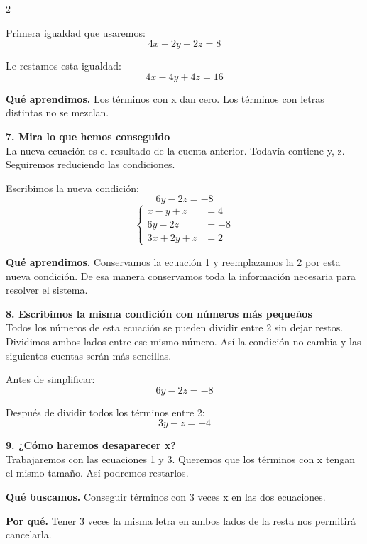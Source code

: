 \documentclass[11pt,a4paper,landscape]{article}
\begin{document}
\begin{multicols*}{2}
\begin{minipage}{\linewidth}
\par\smallskip Primera igualdad que usaremos:
\[4x + 2y + 2z = 8\]
\par\smallskip Le restamos esta igualdad:
\[4x - 4y + 4z = 16\]
\par\smallskip\textbf{Qué aprendimos.} Los términos con x dan cero. Los términos con letras distintas no se mezclan.
\end{minipage}\par\medskip
\noindent\begin{minipage}{\linewidth}\textbf{7. Mira lo que hemos conseguido}\\[2pt]La nueva ecuación es el resultado de la cuenta anterior. Todavía contiene y, z. Seguiremos reduciendo las condiciones.
\par\smallskip Escribimos la nueva condición:
\[6y - 2z = -8\]
\[\left\{\begin{aligned}x - y + z &= 4\\6y - 2z &= -8\\3x + 2y + z &= 2\end{aligned}\right.\]
\par\smallskip\textbf{Qué aprendimos.} Conservamos la ecuación 1 y reemplazamos la 2 por esta nueva condición. De esa manera conservamos toda la información necesaria para resolver el sistema.
\end{minipage}\par\medskip
\noindent\begin{minipage}{\linewidth}\textbf{8. Escribimos la misma condición con números más pequeños}\\[2pt]Todos los números de esta ecuación se pueden dividir entre 2 sin dejar restos. Dividimos ambos lados entre ese mismo número. Así la condición no cambia y las siguientes cuentas serán más sencillas.
\par\smallskip Antes de simplificar:
\[6y - 2z = -8\]
\par\smallskip Después de dividir todos los términos entre 2:
\[3y - z = -4\]
\end{minipage}\par\medskip
\noindent\begin{minipage}{\linewidth}\textbf{9. ¿Cómo haremos desaparecer x?}\\[2pt]Trabajaremos con las ecuaciones 1 y 3. Queremos que los términos con x tengan el mismo tamaño. Así podremos restarlos.
\par\smallskip\textbf{Qué buscamos.} Conseguir términos con 3 veces x en las dos ecuaciones.
\par\smallskip\textbf{Por qué.} Tener 3 veces la misma letra en ambos lados de la resta nos permitirá cancelarla.

\end{minipage}
\end{multicols*}
\end{document}
